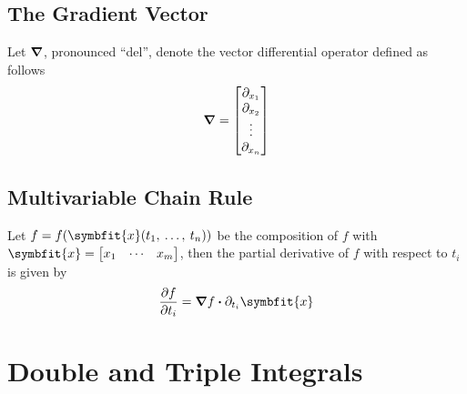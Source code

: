 \documentclass{article}
\begin{document}
\subsection{The Gradient Vector}
\begin{definition}
    Let $\grad$, pronounced ``del'', denote the vector differential operator defined as follows
    \begin{equation*}
        \grad = \mqty[\partial_{x_1} \\ \partial_{x_2} \\ \vdots \\ \partial_{x_n}]
    \end{equation*}
\end{definition}
\subsection{Multivariable Chain Rule}
\begin{theorem}
    Let $f=f(\symbfit{x}(t_1,\: \ldots,\: t_n))$ be the composition of $f$ with $\symbfit{x}=\mqty[x_1 & \cdots & x_m]$, then the partial derivative of $f$ with respect to $t_i$ is given by
    \begin{equation*}
        \pdv{f}{t_i} = \grad{f} \vdot \partial_{t_i}\symbfit{x}
    \end{equation*}
\end{theorem}
\newpage
\section{Double and Triple Integrals}
\end{document}
